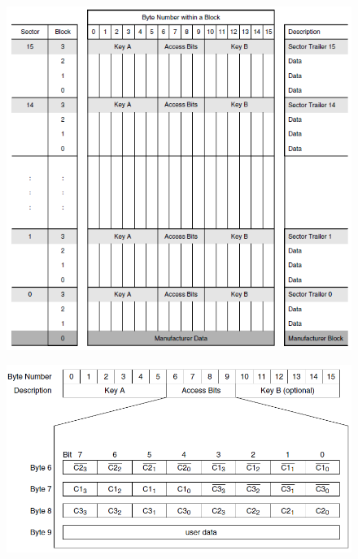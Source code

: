 \documentclass[fleqn,10pt]{SelfArx} %
\begin{document}
\begin{figure}[h]
\centering
\begin{minipage}[b]{.47\textwidth}
  \centering
  \includegraphics[width=\textwidth]{img/mem1k.png}
  \label{fig:mem1k}
\end{minipage}
\begin{minipage}[b]{.47\textwidth}
  \centering
  \includegraphics[width=\textwidth]{img/access.png}
  \label{fig:access}
\end{minipage}
\end{figure}
\end{document}
